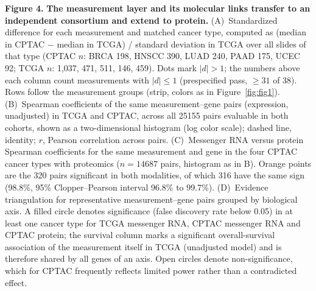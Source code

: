 \label{fig:fig4}
\noindent\textbf{Figure 4.} \textbf{The measurement layer and its molecular links transfer to an 
independent consortium and extend to protein.} 
(A)~Standardized difference for each measurement and matched cancer type, 
computed as (median in CPTAC $-$ median in TCGA) / standard deviation in TCGA 
over all slides of that type (CPTAC $n$: BRCA 198, HNSCC 390, LUAD 240, PAAD 175, 
UCEC 92; TCGA $n$: 1,037, 471, 511, 146, 459). Dots mark $|d| > 1$; the numbers 
above each column count measurements with $|d| \leq 1$ (prespecified pass, 
$\geq 31$ of 38). Rows follow the measurement groups (strip, colors as in 
Figure~\ref{fig:fig1}). 
(B)~Spearman coefficients of the same measurement--gene pairs (expression, 
unadjusted) in TCGA and CPTAC, across all \num{25155} pairs evaluable in both 
cohorts, shown as a two-dimensional histogram (log color scale); dashed line, 
identity; $r$, Pearson correlation across pairs. 
(C)~Messenger RNA versus protein Spearman coefficients for the same measurement 
and gene in the four CPTAC cancer types with proteomics ($n = \num{14687}$ 
pairs, histogram as in B). Orange points are the 320 pairs significant in both 
modalities, of which 316 have the same sign (98.8\%, 95\% Clopper--Pearson 
interval 96.8\% to 99.7\%). 
(D)~Evidence triangulation for representative measurement--gene pairs grouped 
by biological axis. A filled circle denotes significance (false discovery rate 
below 0.05) in at least one cancer type for TCGA messenger RNA, CPTAC messenger 
RNA and CPTAC protein; the survival column marks a significant 
overall-survival association of the measurement itself in TCGA (unadjusted 
model) and is therefore shared by all genes of an axis. Open circles denote 
non-significance, which for CPTAC frequently reflects limited power rather than 
a contradicted effect.
\par\medskip

